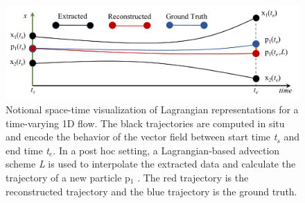 \begin{figure}[!t]
\centering
\includegraphics[width=0.9\linewidth]{Images/sample.pdf}
\vspace{-5mm}
\caption{Notional space-time visualization of Lagrangian representations for a time-varying 1D flow. The black trajectories are computed in situ and encode the behavior of the vector field between start time \textit{t$_{s}$} and end time \textit{t$_{e}$}. In a post hoc setting, a Lagrangian-based advection scheme \textit{L} is used to interpolate the extracted data and calculate the trajectory of a new particle p$_{1}$ . The red trajectory is the reconstructed trajectory and the blue trajectory is the ground truth.}
\vspace{-5mm}
\label{fig:sample}
\end{figure}

%
%
%
%

%
%
%
%
%
%

